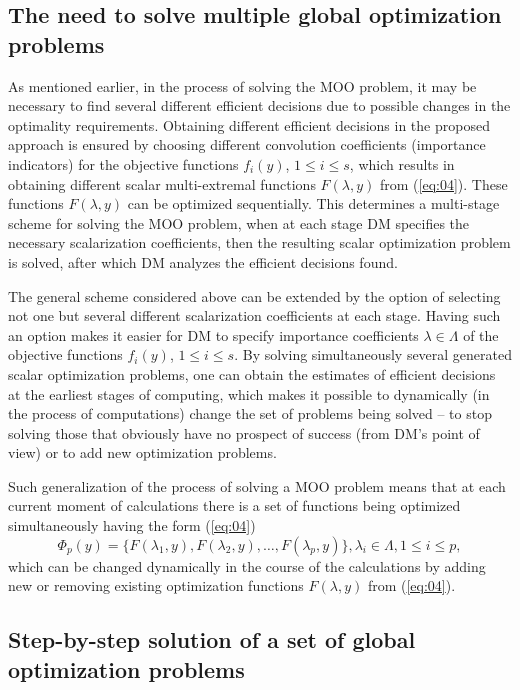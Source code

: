 \documentclass[runningheads]{llncs}
\begin{document}
\subsection{The need to solve multiple global optimization problems} 
\label{subsec:41}

As mentioned earlier, in the process of solving the MOO problem, it may be necessary to find several different efficient decisions due to possible changes in the optimality requirements. Obtaining different efficient decisions in the proposed approach is ensured by choosing different convolution coefficients (importance indicators) for the objective functions $f_i(y)$, $1 \leq i \leq s$, which results in obtaining different  scalar multi-extremal functions $F(\lambda, y)$ from (\ref{eq:04}). These functions $F(\lambda, y)$ can be optimized sequentially. This determines a multi-stage scheme for solving the MOO problem, when at each stage DM specifies the necessary scalarization coefficients, then the resulting scalar optimization problem is solved, after which DM analyzes the efficient decisions found. 

The general scheme considered above can be extended by the option of selecting not one but several different scalarization coefficients at each stage. Having such an option makes it easier for DM  to specify importance coefficients $\lambda \in \Lambda$ of the objective functions $f_i(y)$, $1 \leq i \leq s$. By solving simultaneously several generated scalar optimization problems, one can  obtain the estimates of efficient decisions at the earliest stages of computing, which makes it possible to dynamically (in the process of computations) change the set of problems being solved -- to stop solving those that obviously have no prospect of success (from DM's point of view) or to add new optimization problems. 

Such generalization of the process of solving a MOO problem means that at each current moment of calculations there is a set of functions being optimized simultaneously having the form (\ref{eq:04})
\begin{equation}
\label{eq:21}
\Phi_p (y)=\{ F(\lambda_1,y), F(\lambda_2,y),\dots,F(\lambda_p,y)  \},  \lambda_i \in \Lambda, 1 \leq i \leq p,
\end{equation}
which can be changed dynamically in the course of the calculations by adding new or removing existing optimization functions $F(\lambda, y)$ from (\ref{eq:04}). 


\subsection{Step-by-step solution of a set of global optimization problems} 
\label{subsec:42}
\end{document}
